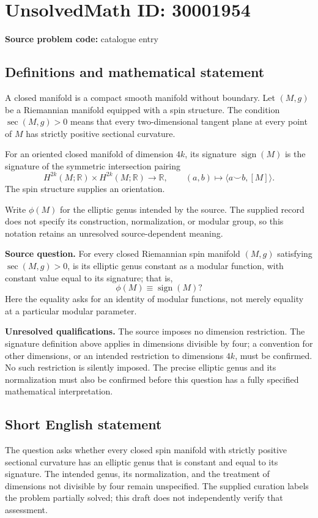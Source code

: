 \documentclass[11pt]{article}
\newcommand{\R}{\mathbb{R}}
\begin{document}
\section*{UnsolvedMath ID: 30001954}
\textbf{Source problem code:} catalogue entry
\subsection{Definitions and mathematical statement}
A closed manifold is a compact smooth manifold without boundary. Let \((M,g)\) be a Riemannian manifold equipped with a spin structure. The condition \(\operatorname{sec}(M,g)>0\) means that every two-dimensional tangent plane at every point of \(M\) has strictly positive sectional curvature.

For an oriented closed manifold of dimension \(4k\), its signature \(\operatorname{sign}(M)\) is the signature of the symmetric intersection pairing
\[
H^{2k}(M;\R)\times H^{2k}(M;\R)\longrightarrow\R,
\qquad (a,b)\longmapsto\langle a\smile b,[M]\rangle.
\]
The spin structure supplies an orientation.

Write \(\phi(M)\) for the elliptic genus intended by the source. The supplied record does not specify its construction, normalization, or modular group, so this notation retains an unresolved source-dependent meaning.

\textbf{Source question.} For every closed Riemannian spin manifold \((M,g)\) satisfying \(\operatorname{sec}(M,g)>0\), is its elliptic genus constant as a modular function, with constant value equal to its signature; that is,
\[
\phi(M)\equiv\operatorname{sign}(M)?
\]
Here the equality asks for an identity of modular functions, not merely equality at a particular modular parameter.

\textbf{Unresolved qualifications.} The source imposes no dimension restriction. The signature definition above applies in dimensions divisible by four; a convention for other dimensions, or an intended restriction to dimensions \(4k\), must be confirmed. No such restriction is silently imposed. The precise elliptic genus and its normalization must also be confirmed before this question has a fully specified mathematical interpretation.
\subsection{Short English statement}
The question asks whether every closed spin manifold with strictly positive sectional curvature has an elliptic genus that is constant and equal to its signature. The intended genus, its normalization, and the treatment of dimensions not divisible by four remain unspecified. The supplied curation labels the problem partially solved; this draft does not independently verify that assessment.
\end{document}
